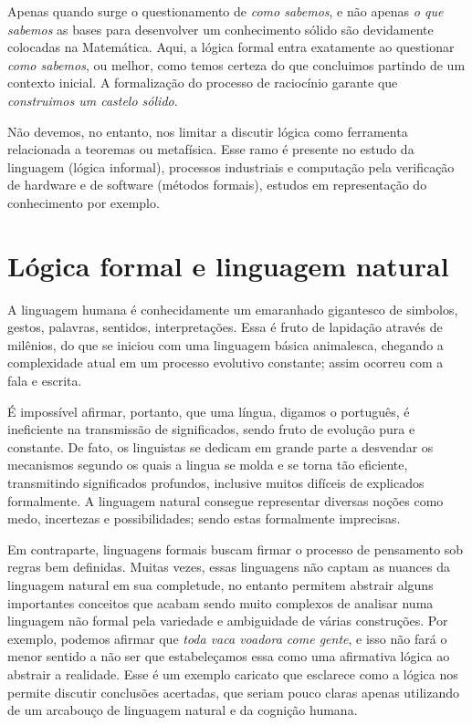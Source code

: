Apenas quando surge o questionamento de \textit{como sabemos}, e não apenas \textit{o que sabemos} as bases para desenvolver um conhecimento sólido são devidamente colocadas na Matemática.
Aqui, a lógica formal entra exatamente ao questionar \textit{como sabemos}, ou melhor, como temos certeza do que concluimos partindo de um contexto inicial.
A formalização do processo de raciocínio garante que \textit{construimos um castelo sólido}.

Não devemos, no entanto, nos limitar a discutir lógica como ferramenta relacionada a teoremas ou metafísica. Esse ramo é presente no estudo da linguagem (lógica informal), processos industriais e computação pela verificação de hardware e de software (métodos formais), estudos em representação do conhecimento por exemplo.

\section{Lógica formal e linguagem natural}
A linguagem humana é conhecidamente um emaranhado gigantesco de simbolos, gestos, palavras, sentidos, interpretações.
Essa é fruto de lapidação através de milênios, do que se iniciou com uma linguagem básica animalesca, chegando a complexidade atual em um processo evolutivo constante; assim ocorreu com a fala e escrita.

É impossível afirmar, portanto, que uma língua, digamos o português, é ineficiente na transmissão de significados, sendo fruto de evolução pura e constante.
De fato, os linguistas se dedicam em grande parte a desvendar os mecanismos segundo os quais a lingua se molda e se torna tão eficiente, transmitindo significados profundos, inclusive muitos difíceis de explicados formalmente. A linguagem natural consegue representar diversas noções como medo, incertezas e possibilidades; sendo estas formalmente imprecisas.

Em contraparte, linguagens formais buscam firmar o processo de pensamento sob regras bem definidas. Muitas vezes, essas linguagens não captam as nuances da linguagem natural em sua completude, no entanto permitem abstrair alguns importantes conceitos que acabam sendo muito complexos de analisar numa linguagem não formal pela variedade e ambiguidade de várias construções.
Por exemplo, podemos afirmar que \textit{toda vaca voadora come gente}, e isso não fará o menor sentido a não ser que estabeleçamos essa como uma afirmativa lógica ao abstrair a realidade.
Esse é um exemplo caricato que esclarece como a lógica nos permite discutir conclusões acertadas, que seriam pouco claras apenas utilizando de um arcabouço de linguagem natural e da cognição humana.

